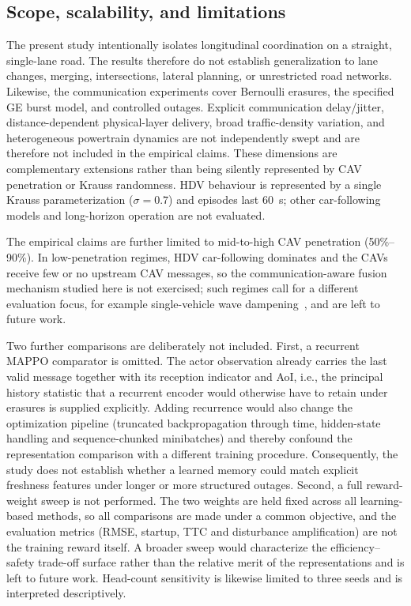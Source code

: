 \documentclass{ieeeaccess}
\begin{document}
\subsection{Scope, scalability, and limitations}
\label{sec:limitations}

The present study intentionally isolates longitudinal coordination on a straight, single-lane road. The results therefore do not establish generalization to lane changes, merging, intersections, lateral planning, or unrestricted road networks. Likewise, the communication experiments cover Bernoulli erasures, the specified GE burst model, and controlled outages. Explicit communication delay/jitter, distance-dependent physical-layer delivery, broad traffic-density variation, and heterogeneous powertrain dynamics are not independently swept and are therefore not included in the empirical claims. These dimensions are complementary extensions rather than being silently represented by CAV penetration or Krauss randomness. HDV behaviour is represented by a single Krauss parameterization ($\sigma=0.7$) and episodes last 60~s; other car-following models and long-horizon operation are not evaluated.

The empirical claims are further limited to mid-to-high CAV penetration (50\%--90\%). In low-penetration regimes, HDV car-following dominates and the CAVs receive few or no upstream CAV messages, so the communication-aware fusion mechanism studied here is not exercised; such regimes call for a different evaluation focus, for example single-vehicle wave dampening~\cite{wu2017flow}, and are left to future work.

Two further comparisons are deliberately not included. First, a recurrent MAPPO comparator is omitted. The actor observation already carries the last valid message together with its reception indicator and AoI, i.e., the principal history statistic that a recurrent encoder would otherwise have to retain under erasures is supplied explicitly. Adding recurrence would also change the optimization pipeline (truncated backpropagation through time, hidden-state handling and sequence-chunked minibatches) and thereby confound the representation comparison with a different training procedure. Consequently, the study does not establish whether a learned memory could match explicit freshness features under longer or more structured outages. Second, a full reward-weight sweep is not performed. The two weights are held fixed across all learning-based methods, so all comparisons are made under a common objective, and the evaluation metrics (RMSE, startup, TTC and disturbance amplification) are not the training reward itself. A broader sweep would characterize the efficiency--safety trade-off surface rather than the relative merit of the representations and is left to future work. Head-count sensitivity is likewise limited to three seeds and is interpreted descriptively.
\end{document}
